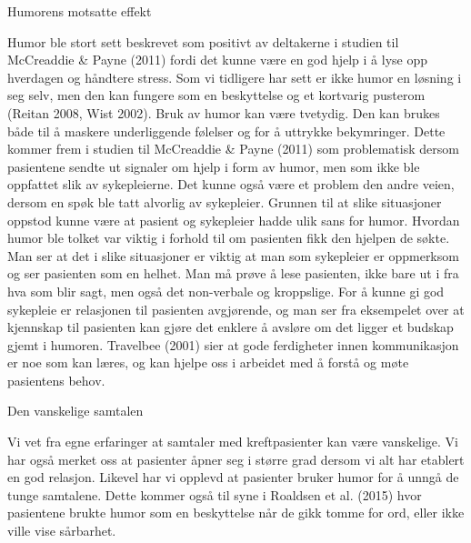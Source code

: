
Humorens motsatte effekt

Humor ble stort sett beskrevet som positivt av deltakerne i studien til
McCreaddie \&{} Payne (2011) fordi det kunne være en god hjelp i å lyse opp
hverdagen og håndtere stress. Som vi tidligere har sett er ikke humor en
løsning i seg selv, men den kan fungere som en beskyttelse og et kortvarig
pusterom (Reitan 2008, Wist 2002). Bruk av humor kan være tvetydig. Den kan
brukes både til å maskere underliggende følelser og for å uttrykke bekymringer.
Dette kommer frem i studien til McCreaddie \&{} Payne (2011) som problematisk
dersom pasientene sendte ut signaler om hjelp i form av humor, men som ikke ble
oppfattet slik av sykepleierne. Det kunne også være et problem den andre veien,
dersom en spøk ble tatt alvorlig av sykepleier. Grunnen til at slike
situasjoner oppstod kunne være at pasient og sykepleier hadde ulik sans for
humor. Hvordan humor ble tolket var viktig i forhold til om pasienten fikk den
hjelpen de søkte. Man ser at det i slike situasjoner er viktig at man som
sykepleier er oppmerksom og ser pasienten som en helhet. Man må prøve å lese
pasienten, ikke bare ut i fra hva som blir sagt, men også det non-verbale og
kroppslige. For å kunne gi god sykepleie er relasjonen til pasienten
avgjørende, og man ser fra eksempelet over at kjennskap til pasienten kan gjøre
det enklere å avsløre om det ligger et budskap gjemt i humoren. Travelbee
(2001) sier at gode ferdigheter innen kommunikasjon er noe som kan læres, og
kan hjelpe oss i arbeidet med å forstå og møte pasientens behov.

Den vanskelige samtalen

Vi vet fra egne erfaringer at samtaler med kreftpasienter kan være vanskelige.
Vi har også merket oss at pasienter åpner seg i større grad dersom vi alt har
etablert en god relasjon. Likevel har vi opplevd at pasienter bruker humor for
å unngå de tunge samtalene. Dette kommer også til syne i Roaldsen et al. (2015)
hvor pasientene brukte humor som en beskyttelse når de gikk tomme for ord,
eller ikke ville vise sårbarhet.

